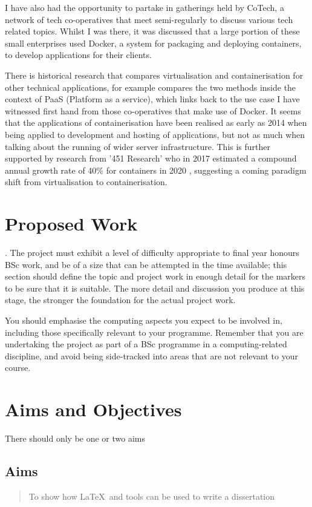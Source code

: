 I have also had the opportunity to partake in gatherings held by CoTech, a network of tech co-operatives that meet semi-regularly to discuss various tech related topics. Whilst I was there, it was discussed that a large portion of these small enterprises used Docker, a system for packaging and deploying containers, to develop applications for their clients.

There is historical research that compares virtualisation and containerisation for other technical applications, for example \citep{dua14} compares the two methods inside the context of PaaS (Platform as a service), which links back to the use case I have witnessed first hand from those co-operatives that make use of Docker. It seems that the applications of containerisation have been realised as early as 2014 when being applied to development and hosting of applications, but not as much when talking about the running of wider server infrastructure. This is further supported by research from '451 Research' who in 2017 estimated a compound annual growth rate of 40\% for containers in 2020 \citep{451}, suggesting a coming paradigm shift from virtualisation to containerisation.

\section{Proposed Work}
\label{proposed}
.  The project must exhibit a level of difficulty appropriate to final year honours BSc work, and be of a size that can be attempted in the time available; this section should define the topic and project work in enough detail for the markers to be sure that it is suitable. The more detail and discussion you produce at this stage, the stronger the foundation for the actual project work.

You should emphasise the computing aspects you expect to be involved in, including those specifically relevant to your programme.  Remember that you are undertaking the project as part of a BSc programme in a computing-related discipline, and avoid being side-tracked into areas that are not relevant to your course.

\section{Aims and Objectives}
There should only be one or two aims
\subsection{Aims}
\begin{quote}
	To show how \LaTeX\ and tools can be used to write a dissertation
\end{quote}

